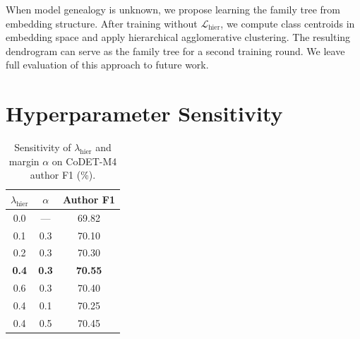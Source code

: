 \documentclass{article}
\begin{document}
When model genealogy is unknown, we propose learning the family tree from embedding structure. After training without $\mathcal{L}_{\text{hier}}$, we compute class centroids in embedding space and apply hierarchical agglomerative clustering. The resulting dendrogram can serve as the family tree for a second training round. We leave full evaluation of this approach to future work.


\section{Hyperparameter Sensitivity}
\label{app:hyperparam}

\begin{table}[h]
\caption{Sensitivity of $\lambda_{\text{hier}}$ and margin $\alpha$ on CoDET-M4 author F1 (\%).}
\centering
\small
\begin{tabular}{cc|c}
\toprule
$\lambda_{\text{hier}}$ & $\alpha$ & \textbf{Author F1} \\
\midrule
0.0 & --- & 69.82 \\
0.1 & 0.3 & 70.10 \\
0.2 & 0.3 & 70.30 \\
\rowcolor{ours}
\textbf{0.4} & \textbf{0.3} & \textbf{70.55} \\
0.6 & 0.3 & 70.40 \\
0.4 & 0.1 & 70.25 \\
0.4 & 0.5 & 70.45 \\
\bottomrule
\end{tabular}
\end{table}




\end{document}
